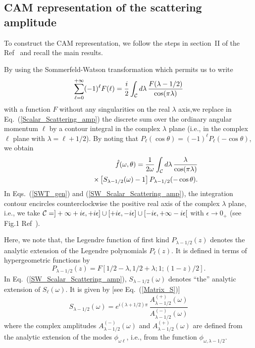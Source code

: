\documentclass[aps,prd,longbibliography,reprint,twocolumn,amsmath,amssymb,amsfonts,showpacs,superscriptaddress]{revtex4-1}%
\begin{document}
\subsection{CAM representation of the scattering amplitude}
\label{SecIIc}

To construct the CAM representation, we follow the steps in section~II of the Ref~\cite{Folacci:2019cmc} and recall the main results.


By using the Sommerfeld-Watson transformation \cite{Watson18,Sommerfeld49,Newton:1982qc} which permits us to write
\begin{equation}\label{SWT_gen}
\sum_{\ell=0}^{+\infty} (-1)^\ell F(\ell)= \frac{i}{2} \int_{\cal C} d\lambda \, \frac{F(\lambda -1/2)}{\cos (\pi \lambda)}
\end{equation}
with a function $F$ without any singularities on the real $\lambda$ axis,we replace in Eq.~(\ref{Scalar_Scattering_amp}) the discrete sum over the ordinary angular momentum $\ell$ by a contour integral in the complex $\lambda$ plane (i.e., in the complex $\ell$ plane with $\lambda = \ell +1/2$). By noting that $P_\ell (\cos \theta)=(-1)^\ell P_\ell (-\cos \theta)$, we obtain
\begin{eqnarray}\label{SW_Scalar_Scattering_amp}
& & \hat{f}(\omega,\theta) = \frac{1}{2 \omega}  \int_{\cal C} d\lambda \, \frac{\lambda}{\cos (\pi \lambda)} \nonumber \\
&&  \qquad\qquad   \times \left[ S_{\lambda -1/2} (\omega) -1 \right]P_{\lambda -1/2} (-\cos \theta).
\end{eqnarray}
In Eqs.~(\ref{SWT_gen}) and (\ref{SW_Scalar_Scattering_amp}), the integration contour encircles counterclockwise the positive real axis of the complex $\lambda$ plane, i.e., we take ${\cal C}=]+\infty +i\epsilon,+i\epsilon] \cup
[+i\epsilon,-i\epsilon] \cup [-i\epsilon, +\infty -i\epsilon[$ with $\epsilon \to 0_+$ (see Fig.1 Ref~\cite{Folacci:2019cmc}).

Here, we note that, the Legendre function of first kind $P_{\lambda -1/2} (z)$ denotes the analytic extension of the Legendre polynomials $P_\ell (z)$. It is defined in terms of hypergeometric functions by \cite{AS65}
\begin{equation}\label{Def_ext_LegendreP}
P_{\lambda -1/2} (z) = F[1/2-\lambda,1/2+\lambda;1;(1-z)/2].
\end{equation}
In Eq.~(\ref{SW_Scalar_Scattering_amp}), $S_{\lambda -1/2} (\omega)$ denotes ``the'' analytic extension of $S_\ell (\omega)$. It is given by [see Eq.~(\ref{Matrix_S})]
\begin{equation}\label{Matrix_S_CAM}
  S_{\lambda -1/2}(\omega) =  e^{i(\lambda + 1/2)\pi} \, \frac{A_{\lambda -1/2}^{(+)}(\omega)}{A_{\lambda -1/2}^{(-)}(\omega)}
\end{equation}
where the complex amplitudes $A^{(-)}_{\lambda -1/2} (\omega)$ and  $A^{(+)}_{\lambda -1/2} (\omega)$ are defined from the analytic extension of the modes $\phi_{\omega \ell}$, i.e., from the function $\phi_{\omega ,\lambda -1/2}$.
\end{document}
